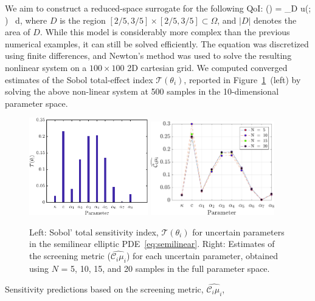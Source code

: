We aim to construct a reduced-space surrogate for the following QoI:
\be
{}(\vec\theta) =  \int_D u(; \vec\theta) \, d, 
\label{eq:qoi}
\ee
%
where $D$ is the region $[2/5, 3/5] \times [2/5, 3/5] \subset \Omega$, 
and $|D|$ denotes the area of $D$. 
While this model is considerably more complex than the previous numerical
examples, it can still be solved efficiently.
The equation was discretized using finite differences, and Newton's method
was used to solve the resulting nonlinear system on a $100 \times 100$ 2D
cartesian grid.
We computed converged estimates of the Sobol
total-effect index $\mathcal{T}(\theta_i)$, reported 
in Figure~\ref{fig:sense_elliptic}~(left) by solving the above non-linear
system at 500 samples in the 10-dimensional parameter space. 
%
\begin{figure}[htbp]
 \begin{center}
  \includegraphics[width=0.46\textwidth]{./Figures/sense_elliptic}
  \includegraphics[width=0.48\textwidth]{./Figures/ub_conv_elliptic}
\caption{
Left: Sobol' total sensitivity index, $\mathcal{T}(\theta_i)$ for uncertain parameters in the 
semilinear elliptic PDE~\eqref{eq:semilinear}. Right: 
Estimates of the screening metric ($\widehat{\mathcal{C}_i\mu_i}$) for each uncertain parameter,
obtained using $N$ = 5, 10, 15, and 20 samples in the full parameter space.}
\label{fig:sense_elliptic}
\end{center}
\end{figure}
%
Sensitivity predictions based on the screening metric, $\widehat{\mathcal{C}_i\mu_i}$,
